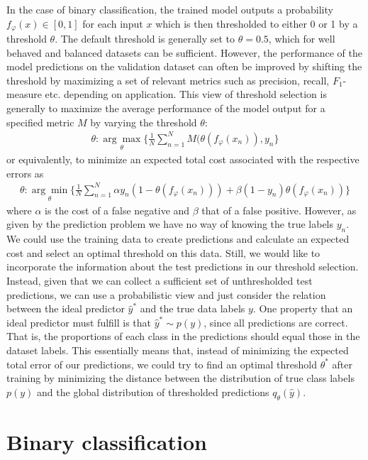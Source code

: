 \documentclass{article}
\begin{document}
In the case of binary classification, the trained model outputs a probability $f_\varphi (x) \in [0, 1]$ for each input $x$ which is then thresholded to either 0 or 1 by a threshold $\theta$. The default threshold is generally set to $\theta = 0.5$, which for well behaved and balanced datasets can be sufficient. However, the performance of the model predictions on the validation dataset can often be improved by shifting the threshold by maximizing a set of relevant metrics such as precision, recall, $F_1$-measure etc. depending on application. This view of threshold selection is generally to maximize the average performance of the model output for a specified metric $M$ by varying the threshold $\theta$:
\begin{align}
    \theta : \underset{\theta}{\arg\max}\{\frac{1}{N} \sum_{n=1}^N M(\theta(f_\varphi(x_n)), y_n\}
\end{align}
or equivalently, to minimize an expected total cost associated with the respective errors as
\begin{align}
	\label{eq:cost}
    \theta : \underset{\theta}{\arg\min}\{\frac{1}{N} \sum_{n=1}^N \alpha y_n (1-\theta(f_\varphi(x_n)) )+ \beta (1-y_n) \theta(f_\varphi(x_n))\}
\end{align}
where $\alpha$ is the cost of a false negative and $\beta$ that of a false positive. However, as given by the prediction problem we have no way of knowing the true labels $y_n$. We could use the training data to create predictions and calculate an expected cost and select an optimal threshold on this data. Still, we would like to incorporate the information about the test predictions in our threshold selection.
Instead, given that we can collect a sufficient set of unthresholded test predictions, we can use a probabilistic view and just consider the relation between the ideal predictor $\hat{y}^*$ and the true data labels $y$. One property that an ideal predictor must fulfill is that $\hat{y}^* \sim p(y)$, since all predictions are correct. That is, the proportions of each class in the predictions should equal those in the dataset labels. This essentially means that, instead of minimizing the expected total error of our predictions, we could try to find an optimal threshold $\theta^*$ after training by minimizing the distance between the distribution of true class labels $p(y)$ and the global distribution of thresholded predictions $q_\theta(\hat{y})$.

\section{Binary classification}
\end{document}
